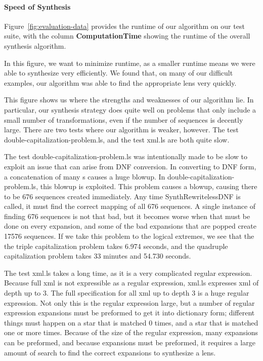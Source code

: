\documentclass[numbers,10pt,preprint\ifanon ,nocopyrightspace\fi]{sigplanconf}
\begin{document}
\paragraph*{Speed of Synthesis}
%
Figure~\ref{fig:evaluation-data} provides the runtime of our algorithm on our
test suite, with the column \textbf{ComputationTime} showing the runtime of the
overall synthesis algorithm.

In this figure, we want to minimize runtime, as a smaller runtime means we were
able to synthesize very efficiently.
We found that, on many of our difficult examples, our algorithm was able to find
the appropriate lens very quickly.

This figure shows us where the strengths and weaknesses of our algorithm lie.
In particular, our synthesis strategy does quite well on problems that only
include a small number of transformations, even if the number of sequences is
decently large.
There are two tests where our algorithm is weaker, however.  The test
double-capitalization-problem.ls, and the test xml.ls are both quite slow.

The test double-capitalization-problem.ls was intentionally made to be slow to
exploit an issue that can arise from DNF conversion.  In converting to DNF form,
a concatenation of many \OrRegexType{}s causes a huge blowup.  In
double-capitalization-problem.ls, this blowup is exploited.  This problem causes a
blowup, causing there to be 676 sequences created immediately.
Any time SynthRewritelessDNF is called, it must find the correct mapping of all
676 sequences.  A single instance of finding 676 sequences is not that bad, but it
becomes worse when that must be done on every expansion, and some of the bad
expansions that are popped create 17576 sequences.
If we take this problem to the logical extremes, we see that the the triple
capitalization problem takes 6.974 seconds, and the quadruple capitalization
problem takes 33 minutes and 54.730 seconds.

The test xml.ls takes a long time, as it is a very complicated regular
expression.  Because full xml is not expressible as a regular expression, xml.ls
expresses xml of depth up to 3.  The full specification for all xml up to depth
3 is a huge regular expression.  Not only
this is the regular expression large,
but a number of regular expression expansions must be preformed to get it
into dictionary form; different things must happen on a star that is matched
0 times, and a star that is matched one or more times.  Because of the size of
the regular expression, many expansions can be preformed, and because expansions
must be preformed, it requires a large amount of search to find the correct
expansions to synthesize a lens.
\end{document}
